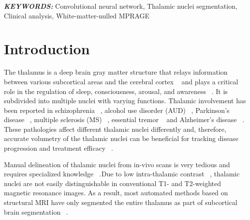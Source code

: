 \textbf{\textit{KEYWORDS: }} Convolutional neural network, Thalamic nuclei segmentation, Clinical analysis, White-matter-nulled MPRAGE


    
\section{Introduction}
 The thalamus is a deep brain gray matter structure that relays information between various subcortical areas and the cerebral cortex \unskip~\cite{1643371:26789934} and plays a critical role in the regulation of sleep, consciousness, arousal, and awareness \unskip~\cite{1643371:26789969,1643371:26789903,1643371:26789938}. It is subdivided into multiple nuclei with varying functions. Thalamic involvement has been reported in schizophrenia \unskip~\cite{1643371:26789949,1643371:26789927}, alcohol use disorder (AUD) \unskip~\cite{1643371:26789925,1643371:26789936}, Parkinson's disease \unskip~\cite{1643371:26789951}, multiple sclerosis (MS) \unskip~\cite{1643371:26789909}, essential tremor \unskip~\cite{1643371:26789937,1643371:26789916,1643371:26789943} and Alzheimer's disease \unskip~\cite{1643371:26789944}. These pathologies affect different thalamic nuclei differently and, therefore, accurate volumetry of the thalamic nuclei can be beneficial for tracking disease progression and treatment efficacy \unskip~\cite{1643371:26789944,1643371:26789946}. 

Manual delineation of thalamic nuclei from in-vivo scans is very tedious and requires specialized knowledge \unskip~\cite{1643371:26789922,1643371:26789924}.\ensuremath{^{}}Due to low intra-thalamic contrast \unskip~\cite{1643371:26789961}, thalamic nuclei are not easily distinguishable in conventional T1- and T2-weighted magnetic resonance images. As a result, most automated methods based on structural MRI have only segmented the entire thalamus as part of subcortical brain segmentation \unskip~\cite{1643371:26789935,1643371:26789929,1643371:26789926,1643371:26789933,1643371:26789917}.\ensuremath{^{}}

